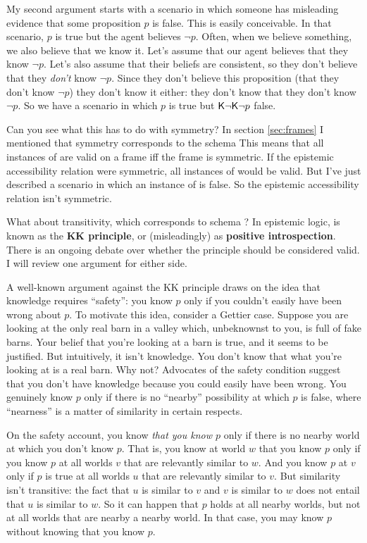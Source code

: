 My second argument starts with a scenario in which someone has misleading
evidence that some proposition $p$ is false. This is easily conceivable. In that
scenario, $p$ is true but the agent believes $\neg p$. Often, when we believe
something, we also believe that we know it. Let's assume that our agent believes
that they know $\neg p$. Let's also assume that their beliefs are consistent, so
they don't believe that they \emph{don't} know $\neg p$. Since they don't
believe this proposition (that they don't know $\neg p$) they don't know it
either: they don't know that they don't know $\neg p$. So we have a scenario in
which $p$ is true but $\operatorname{\mathsf{K}{}}\!\neg\!\operatorname{\mathsf{K}{}}\!\neg p$ false.

Can you see what this has to do with symmetry? In section \ref{sec:frames} I
mentioned that symmetry corresponds to the schema
%
%
This means that all instances of  are valid on a frame iff the frame is
symmetric. If the epistemic accessibility relation were symmetric, all
instances of  would be valid. But I've just described a scenario in which
an instance of  is false. So the epistemic accessibility relation isn't
symmetric.

What about transitivity, which corresponds to schema ?
%
%
In epistemic logic,  is known as the \textbf{KK principle}, or
(misleadingly) as \textbf{positive introspection}. There is an ongoing debate
over whether the principle should be considered valid. I will review one
argument for either side.

A well-known argument against the KK principle draws on the idea that knowledge
requires ``safety'': you know $p$ only if you couldn't easily have been wrong
about $p$. To motivate this idea, consider a Gettier case. Suppose you are
looking at the only real barn in a valley which, unbeknownst to you, is full of
fake barns. Your belief that you're looking at a barn is true, and it seems to
be justified. But intuitively, it isn't knowledge. You don't know that what
you're looking at is a real barn. Why not? Advocates of the safety condition
suggest that you don't have knowledge because you could easily have been wrong.
You genuinely know $p$ only if there is no ``nearby'' possibility at which $p$
is false, where ``nearness'' is a matter of similarity in certain respects.

On the safety account, you know \emph{that you know $p$} only if there is no
nearby world at which you don't know $p$. That is, you know at world $w$ that
you know $p$ only if you know $p$ at all worlds $v$ that are relevantly similar
to $w$. And you know $p$ at $v$ only if $p$ is true at all worlds $u$ that are
relevantly similar to $v$. But similarity isn't transitive: the fact that $u$ is
similar to $v$ and $v$ is similar to $w$ does not entail that $u$ is similar to
$w$. So it can happen that $p$ holds at all nearby worlds, but not at all worlds
that are nearby a nearby world. In that case, you may know $p$ without knowing
that you know $p$.

